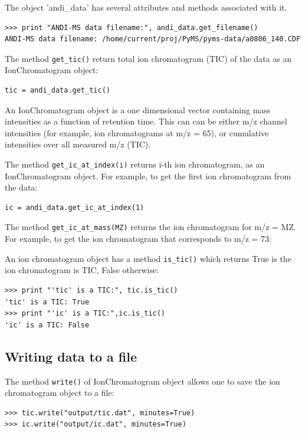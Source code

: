 The object 'andi\_data' has several attributes and methods associated with it.

\begin{verbatim}
>>> print "ANDI-MS data filename:", andi_data.get_filename()
ANDI-MS data filename: /home/current/proj/PyMS/pyms-data/a0806_140.CDF
\end{verbatim}

The method {\tt get\_tic()} return total ion chromatogram (TIC) of the data
as an IonChromatogram object:

\begin{verbatim}
tic = andi_data.get_tic()
\end{verbatim}

\noindent
An IonChromatogram object is a one dimensional vector containing
mass intensities as a function of retention time. This can can be either
m/z channel intensities (for example, ion chromatograms at m/z = 65),
or cumulative intensities over all measured m/z (TIC).

The method {\tt get\_ic\_at\_index(i)} returns i-th ion chromatogram, as
an IonChromatogram object. For example, to get the first ion chromatogram
from the data:

\begin{verbatim}
ic = andi_data.get_ic_at_index(1)
\end{verbatim}

The method {\tt get\_ic\_at\_mass(MZ)} returns the ion chromatogram for
m/z = MZ.  For example, to get the ion chromatogram that corresponds
to m/z = 73:

An ion chromatogram object has a method {\tt is\_tic()} which returns
True is the ion chromatogram is TIC, False otherwise:

\begin{verbatim}
>>> print "'tic' is a TIC:", tic.is_tic()
'tic' is a TIC: True
>>> print "'ic' is a TIC:",ic.is_tic()
'ic' is a TIC: False
\end{verbatim}

\subsection{Writing data to a file}

The method {\tt write()} of IonChromatogram object allows one to save
the ion chromatogram object to a file:

\begin{verbatim}
>>> tic.write("output/tic.dat", minutes=True)
>>> ic.write("output/ic.dat", minutes=True)
\end{verbatim}

